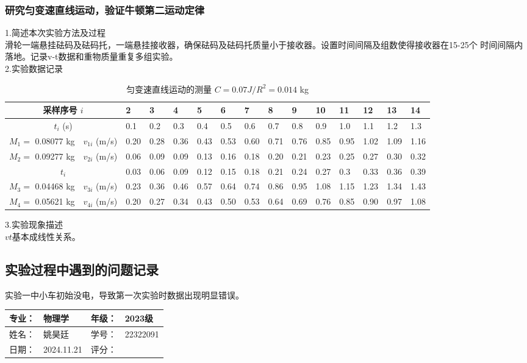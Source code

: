 \documentclass[dvipsnames, svgnames,a4paper,11pt]{article}
\begin{document}
\subsubsection{研究匀变速直线运动，验证牛顿第二运动定律}
\noindent1.简述本次实验方法及过程\\
滑轮一端悬挂砝码及砝码托，一端悬挂接收器，确保砝码及砝码托质量小于接收器。设置时间间隔及组数使得接收器在15-25个
时间间隔内落地。记录v-t数据和重物质量重复多组实验。\\
\noindent2.实验数据记录
\begin{table}[H]
    \centering
    \caption{匀变速直线运动的测量 \hfill $C=0.07$\quad $J/R^2=0.014$ kg}
    \begin{tabularx}{\textwidth}{|c|c|*{13}{X|}}
        \hline
        \multicolumn{2}{|c|}{采样序号 \(i\)} & 2 & 3 & 4 & 5 & 6 & 7 & 8 & 9 & 10 & 11 & 12 & 13 & 14 \\
        \hline
        \multicolumn{2}{|c|}{$t_i$ (s)} & 0.1 & 0.2 & 0.3 & 0.4 & 0.5 & 0.6 & 0.7 & 0.8 & 0.9 & 1.0 & 1.1 & 1.2 & 1.3 \\
        \hline
        $M_1=$ 0.08077 kg & $v_{1i}$ (m/s) & 0.20 & 0.28 & 0.36 & 0.43 & 0.53 & 0.60 & 0.71 & 0.76 & 0.85 & 0.95 & 1.02 & 1.09 & 1.16 \\
        \hline
        $M_2=$ 0.09277 kg & $v_{2i}$ (m/s) & 0.06 & 0.09 & 0.09 & 0.13 & 0.16 & 0.18 & 0.20 & 0.21 & 0.23 & 0.25 & 0.27 & 0.30 & 0.32 \\
        \hline
		\multicolumn{2}{|c|}{$t_i$}&0.03&0.06&0.09&0.12&0.15&0.18&0.21&0.24&0.27&0.3&0.33&0.36&0.39\\
		\hline
        $M_3=$ 0.04468 kg & $v_{3i}$ (m/s) & 0.23 & 0.36 & 0.46 & 0.57 & 0.64 & 0.74 & 0.86 & 0.95 & 1.08 & 1.15 & 1.23 & 1.34 & 1.43 \\
        \hline
        $M_4=$ 0.05621 kg & $v_{4i}$ (m/s) & 0.20 & 0.27 & 0.34 & 0.43 & 0.50 & 0.53 & 0.64 & 0.69 & 0.76 & 0.85 & 0.90 & 0.97 & 1.08 \\
        \hline
    \end{tabularx}
\end{table}
\noindent3.实验现象描述\\
$vt$基本成线性关系。

\subsection{实验过程中遇到的问题记录}
实验一中小车初始没电，导致第一次实验时数据出现明显错误。


\clearpage
{}
\begin{table}
	\renewcommand\arraystretch{1.7}
	\begin{tabularx}{\textwidth}{|X|X|X|X|}
	\hline
	专业：& 物理学 &年级：& 2023级\\
	\hline
	姓名： &姚昊廷& 学号：&22322091 \\
	\hline
    日期：&2024.11.21 & 评分： &\\
	\hline
	\end{tabularx}
\end{table}
\end{document}
